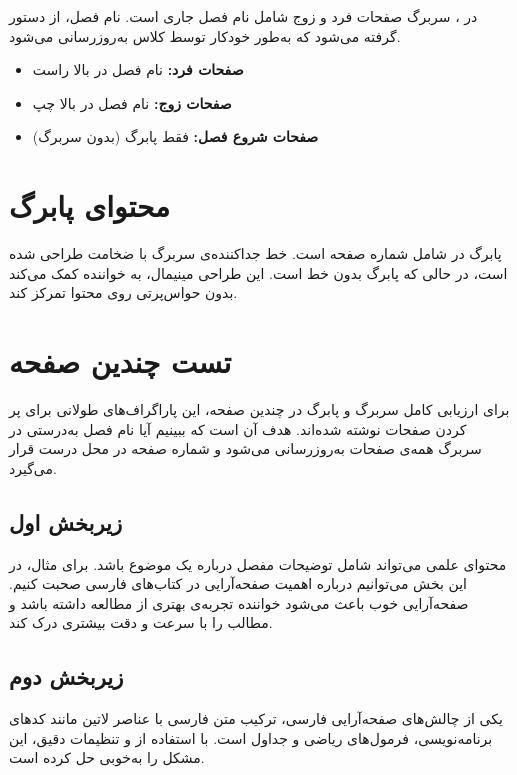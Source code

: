 \documentclass{matinbook}
\begin{document}
در ، سربرگ صفحات فرد و زوج شامل نام فصل جاری
است. نام فصل، از دستور  گرفته
می‌شود که به‌طور خودکار توسط کلاس به‌روزرسانی می‌شود.

\begin{itemize}
    \item \textbf{صفحات فرد:} نام فصل در بالا راست
    \item \textbf{صفحات زوج:} نام فصل در بالا چپ
    \item \textbf{صفحات شروع فصل:} فقط پابرگ (بدون سربرگ)
\end{itemize}


\section{محتوای پابرگ}
\label{sec:headers-footer}

پابرگ در  شامل شماره صفحه است. خط جداکننده‌ی
سربرگ با ضخامت \pnum{۰.۴pt} طراحی شده است، در حالی که
پابرگ بدون خط است. این طراحی مینیمال، به خواننده کمک می‌کند
بدون حواس‌پرتی روی محتوا تمرکز کند.

\section{تست چندین صفحه}
\label{sec:headers-multipage}

برای ارزیابی کامل سربرگ و پابرگ در چندین صفحه، این پاراگراف‌های
طولانی برای پر کردن صفحات نوشته شده‌اند. هدف آن است که ببینیم
آیا نام فصل به‌درستی در سربرگ همه‌ی صفحات به‌روزرسانی می‌شود
و شماره صفحه در محل درست قرار می‌گیرد.

\subsection{زیربخش اول}
\label{sec:headers-sub1}

محتوای علمی می‌تواند شامل توضیحات مفصل درباره یک موضوع باشد.
برای مثال، در این بخش می‌توانیم درباره اهمیت صفحه‌آرایی
در کتاب‌های فارسی صحبت کنیم. صفحه‌آرایی خوب باعث می‌شود
خواننده تجربه‌ی بهتری از مطالعه داشته باشد و مطالب را
با سرعت و دقت بیشتری درک کند.

\subsection{زیربخش دوم}
\label{sec:headers-sub2}

یکی از چالش‌های صفحه‌آرایی فارسی، ترکیب متن فارسی با
عناصر لاتین مانند کدهای برنامه‌نویسی، فرمول‌های ریاضی
و جداول است.  با استفاده از 
و تنظیمات دقیق، این مشکل را به‌خوبی حل کرده است.
\end{document}
